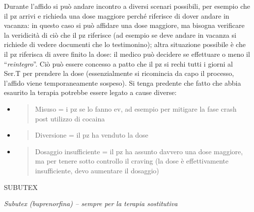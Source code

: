 \documentclass[]{article}
\begin{document}
Durante l'affido si può andare incontro a diversi scenari possibili, per
esempio che il pz arrivi e richieda una dose maggiore perché riferisce
di dover andare in vacanza: in questo caso si può affidare una dose
maggiore, ma bisogna verificare la veridicità di ciò che il pz riferisce
(ad esempio se deve andare in vacanza si richiede di vedere documenti
che lo testimonino); altra situazione possibile è che il pz riferisca di
avere finito la dose: il medico può decidere se effettuare o meno il
``\emph{reintegro}''. Ciò può essere concesso a patto che il pz si rechi
tutti i giorni al Ser.T per prendere la dose (essenzialmente si
ricomincia da capo il processo, l'affido viene temporaneamente sospeso).
Si tenga predente che fatto che abbia esaurito la terapia potrebbe
essere legato a cause diverse:

\begin{itemize}
\item
  \begin{quote}
  Misuso = i pz se lo fanno ev, ad esempio per mitigare la fase crash
  post utilizzo di cocaina
  \end{quote}
\item
  \begin{quote}
  Diversione = il pz ha venduto la dose
  \end{quote}
\item
  \begin{quote}
  Dosaggio insufficiente = il pz ha assunto davvero una dose maggiore,
  ma per tenere sotto controllo il craving (la dose è effettivamente
  insufficiente, devo aumentare il dosaggio)
  \end{quote}
\end{itemize}

SUBUTEX

\emph{Subutex (buprenorfina) -- sempre per la terapia sostitutiva}
\end{document}
